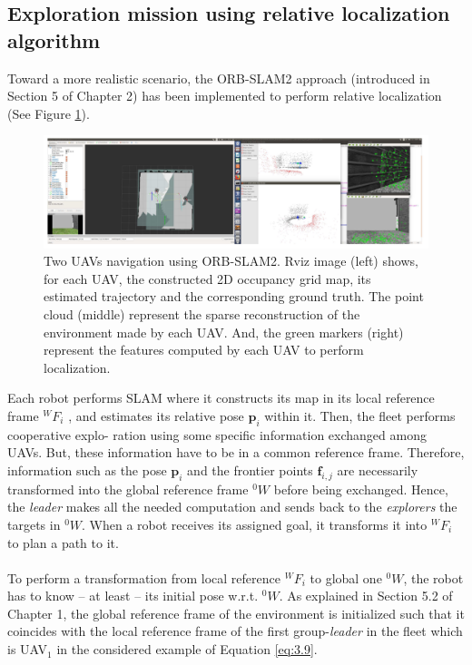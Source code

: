 \documentclass[11pt,openany]{book}
\begin{document}
\subsection{Exploration mission using relative localization algorithm}
Toward a more realistic scenario, the ORB-SLAM2 approach (introduced in Section 5 of Chapter 2) has been implemented to perform relative localization (See Figure \ref{fig:3.23}).
\begin{figure}[H]
    \centering
    \includegraphics[scale=0.3]{assets/3_23.png}
    \caption{Two UAVs navigation using ORB-SLAM2. Rviz image (left) shows, for each UAV, the constructed 2D occupancy grid map, its estimated trajectory and the corresponding ground truth. The point cloud (middle) represent the sparse reconstruction of the environment made by each UAV. And, the green markers (right) represent the features computed by each UAV to perform localization.}
    \label{fig:3.23}
\end{figure}
Each robot performs SLAM where it constructs its map in its local reference frame $^WF_i$ , and estimates its relative pose $\mathbf{p}_i$ within it. Then, the ﬂeet performs cooperative explo- ration using some specific information exchanged among UAVs. But, these information have to be in a common reference frame. Therefore, information such as the pose $\mathbf{p}_i$ and the frontier points $\mathbf{f}_{i,j}$ are necessarily transformed into the global reference frame $^0W$ before being exchanged. Hence, the \textit{leader} makes all the needed computation and sends back to the \textit{explorers} the targets in $^0W$. When a robot receives its assigned goal, it transforms it into $^WF_i$ to plan a path to it.\\\\
To perform a transformation from local reference $^WF_i$ to global one $^0W$, the robot has to know – at least – its initial pose w.r.t. $^0W$. As explained in Section 5.2 of Chapter 1, the global reference frame of the environment is initialized such that it coincides with the local reference frame of the first group-\textit{leader} in the ﬂeet which is UAV$_1$ in the considered example of Equation \ref{eq:3.9}.
\end{document}
